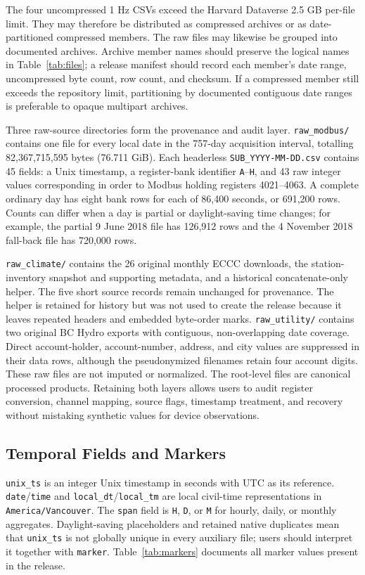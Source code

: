 \documentclass{IEEEoj-data}
\begin{document}
The four uncompressed 1 Hz CSVs exceed the Harvard Dataverse 2.5 GB per-file limit. They may therefore be distributed as compressed archives or as date-partitioned compressed members. The raw files may likewise be grouped into documented archives. Archive member names should preserve the logical names in Table~\ref{tab:files}; a release manifest should record each member's date range, uncompressed byte count, row count, and checksum. If a compressed member still exceeds the repository limit, partitioning by documented contiguous date ranges is preferable to opaque multipart archives.

Three raw-source directories form the provenance and audit layer. \texttt{raw\_modbus/} contains one file for every local date in the 757-day acquisition interval, totalling 82,367,715,595 bytes (76.711 GiB). Each headerless \texttt{SUB\_YYYY-MM-DD.csv} contains 45 fields: a Unix timestamp, a register-bank identifier \texttt{A}--\texttt{H}, and 43 raw integer values corresponding in order to Modbus holding registers 4021--4063. A complete ordinary day has eight bank rows for each of 86,400 seconds, or 691,200 rows. Counts can differ when a day is partial or daylight-saving time changes; for example, the partial 9 June 2018 file has 126,912 rows and the 4 November 2018 fall-back file has 720,000 rows.

\texttt{raw\_climate/} contains the 26 original monthly ECCC downloads, the station-inventory snapshot and supporting metadata, and a historical concatenate-only helper. The five short source records remain unchanged for provenance. The helper is retained for history but was not used to create the release because it leaves repeated headers and embedded byte-order marks. \texttt{raw\_utility/} contains two original BC Hydro exports with contiguous, non-overlapping date coverage. Direct account-holder, account-number, address, and city values are suppressed in their data rows, although the pseudonymized filenames retain four account digits. These raw files are not imputed or normalized. The root-level files are canonical processed products. Retaining both layers allows users to audit register conversion, channel mapping, source flags, timestamp treatment, and recovery without mistaking synthetic values for device observations.

\subsection{Temporal Fields and Markers}
\texttt{unix\_ts} is an integer Unix timestamp in seconds with UTC as its reference. \texttt{date}/\texttt{time} and \texttt{local\_dt}/\texttt{local\_tm} are local civil-time representations in \texttt{America/Vancouver}. The \texttt{span} field is \texttt{H}, \texttt{D}, or \texttt{M} for hourly, daily, or monthly aggregates. Daylight-saving placeholders and retained native duplicates mean that \texttt{unix\_ts} is not globally unique in every auxiliary file; users should interpret it together with \texttt{marker}. Table~\ref{tab:markers} documents all marker values present in the release.
\end{document}
